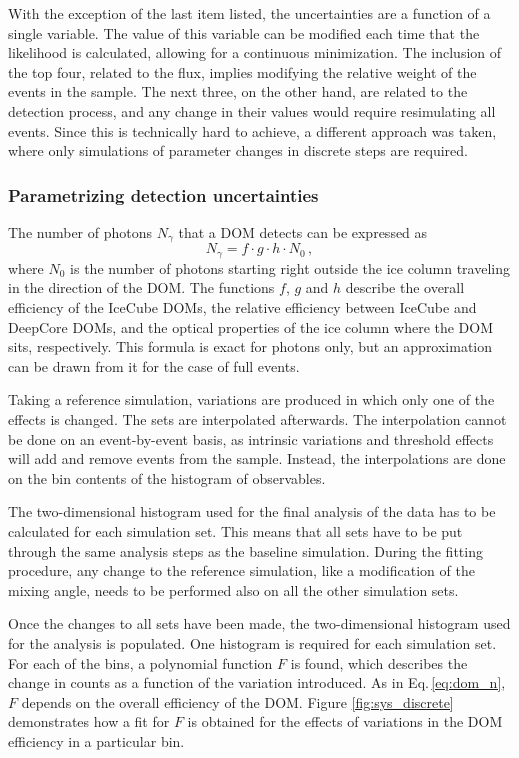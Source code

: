 \documentclass[../Main.tex]{subfiles}
\begin{document}
With the exception of the last item listed, the uncertainties are a function of a single variable. The value of this variable can be modified each time that the likelihood is calculated, allowing for a continuous minimization. The inclusion of the top four, related to the flux, implies modifying the relative weight of the events in the sample. The next three, on the other hand, are related to the detection process, and any change in their values would require resimulating all events. Since this is technically hard to achieve, a different approach was taken, where only simulations of parameter changes in discrete steps are required.

\subsubsection{Parametrizing detection uncertainties}
The number of photons $N_{\gamma}$ that a DOM detects can be expressed as
\begin{equation}
N_\gamma = f\cdot g \cdot h \cdot N_0\,,
\label{eq:dom_n}
\end{equation}
where $N_0$ is the number of photons starting right outside the ice column traveling in the direction of the DOM. The functions $f$, $g$ and $h$ describe the overall efficiency of the IceCube DOMs, the relative efficiency between IceCube and DeepCore DOMs, and the optical properties of the ice column where the DOM sits, respectively. This formula is exact for photons only, but an approximation can be drawn from it for the case of full events.

Taking a reference simulation, variations are produced in which only one of the effects is changed. The sets are interpolated afterwards. The interpolation cannot be done on an event-by-event basis, as intrinsic variations and threshold effects will add and remove events from the sample. Instead, the interpolations are done on the bin contents of the histogram of observables.

The two-dimensional histogram used for the final analysis of the data has to be calculated for each simulation set. This means that all sets have to be put through the same analysis steps as the baseline simulation. During the fitting procedure, any change to the reference simulation, like a modification of the mixing angle, needs to be performed also on all the other simulation sets.

Once the changes to all sets have been made, the two-dimensional histogram used for the analysis is populated. One histogram is required for each simulation set. For each of the bins, a polynomial function $F$ is found, which describes the change in counts as a function of the variation introduced. As in Eq.\,\ref{eq:dom_n}, $F$ depends on the overall efficiency of the DOM. Figure \ref{fig:sys_discrete} demonstrates how a fit for $F$ is obtained for the effects of variations in the DOM efficiency in a particular bin.
\end{document}
